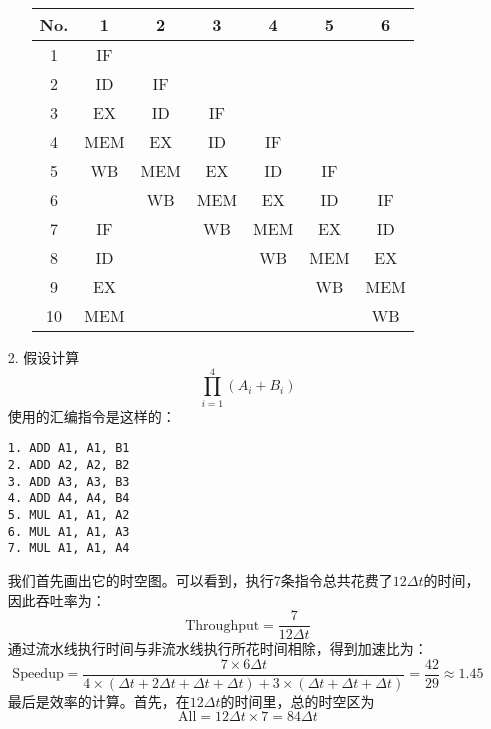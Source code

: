 \documentclass[UTF8,zihao=-4]{ctexart}
\begin{document}
\begin{enumerate}
\begin{enumerate}
			\begin{center}
				\begin{tabular}{|c|c|c|c|c|c|c|}
					\hline
					No. &  1  &  2  &  3  &  4  &  5  &  6  \\ \hline
					 1  & IF  &     &     &     &     &     \\
					 2  & ID  & IF  &     &     &     &     \\
					 3  & EX  & ID  & IF  &     &     &     \\
					 4  & MEM & EX  & ID  & IF  &     &     \\
					 5  & WB  & MEM & EX  & ID  & IF  &     \\
					 6  &     & WB  & MEM & EX  & ID  & IF  \\ \hline
					 7  & IF  &     & WB  & MEM & EX  & ID  \\
					 8  & ID  &     &     & WB  & MEM & EX  \\
					 9  & EX  &     &     &     & WB  & MEM \\
					10  & MEM &     &     &     &     & WB  \\ \hline
				\end{tabular}
			\end{center}
		\end{enumerate}
		\item[2.]假设计算
		\begin{equation*}
			\prod_{i=1}^4\left( A_i+B_i\right)
		\end{equation*}
		使用的汇编指令是这样的：
		\begin{lstlisting}
1. ADD A1, A1, B1
2. ADD A2, A2, B2
3. ADD A3, A3, B3
4. ADD A4, A4, B4
5. MUL A1, A1, A2
6. MUL A1, A1, A3
7. MUL A1, A1, A4
		\end{lstlisting}
		我们首先画出它的时空图。可以看到，执行7条指令总共花费了$12\Delta t$的时间，因此吞吐率为：
		\begin{equation*}
			\text{Throughput}=\frac{7}{12\Delta t}
		\end{equation*}
		通过流水线执行时间与非流水线执行所花时间相除，得到加速比为：
		\begin{equation*}
			\text{Speedup}=\frac{7\times 6\Delta t}{4\times (\Delta t+2\Delta t+\Delta t+\Delta t)+3\times (\Delta t+\Delta t+\Delta t)}=\frac{42}{29}\approx 1.45
		\end{equation*}
		最后是效率的计算。首先，在$12\Delta t$的时间里，总的时空区为
		\begin{equation*}
			\text{All}=12\Delta t\times 7=84\Delta t
		\end{equation*}

\end{enumerate}
\end{document}
